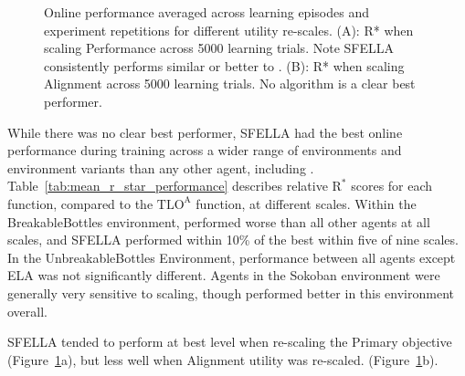 \begin{figure}
  \caption{Online performance averaged across learning episodes and experiment repetitions for different utility re-scales. (A): R* when scaling Performance across 5000 learning trials. Note SFELLA consistently performs similar or better to \tloA{}. (B): R* when scaling Alignment across 5000 learning trials. No algorithm is a clear best performer.%
  }
   \label{fig:online_performance}
 \end{figure}

While there was no clear best performer, SFELLA had the best online performance during training across a wider range of environments and environment variants than any other agent, including \tloA{}. Table~\ref{tab:mean_r_star_performance} describes relative $\text{R}^*$ scores for each function, compared to the $\text{TLO}^\text{A}$ function, at different scales.  Within the BreakableBottles environment, \tloA{} performed worse than all other agents at all scales, and SFELLA performed within 10\% of the best within five of nine scales. In the UnbreakableBottles Environment, performance between all agents except ELA was not significantly different. Agents in the Sokoban environment were generally very sensitive to scaling, though \tloA{} performed better in this environment overall. 



SFELLA tended to perform at best level when re-scaling the Primary objective (Figure~\ref{fig:online_performance}a), but less well when Alignment utility was re-scaled. (Figure~\ref{fig:online_performance}b).

